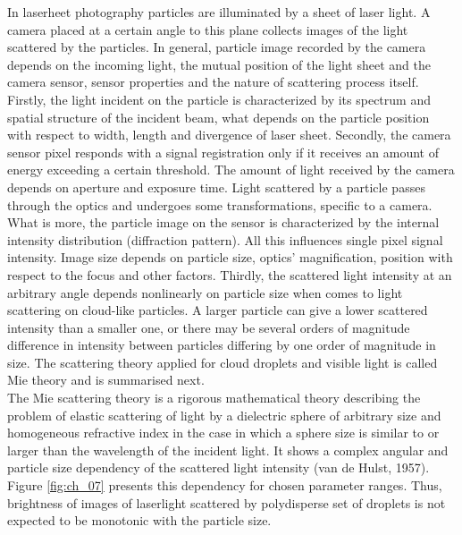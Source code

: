 \documentclass[../main.tex]{subfiles}
\begin{document}
In laserheet photography particles are illuminated by a sheet of laser light. A camera placed at a certain angle to this plane collects images of the light scattered by the particles. In general, particle image recorded by the camera depends on the incoming light, the mutual position of the light sheet and the camera sensor, sensor properties and the nature of scattering process itself. Firstly, the light incident on the particle is characterized by its spectrum and spatial structure of the incident beam, what depends on the particle position with respect to width, length and divergence of laser sheet. Secondly, the camera sensor pixel responds with a signal registration only if it receives an amount of energy exceeding a certain threshold. The amount of light received by the camera depends on aperture and exposure time. Light scattered by a particle passes through the optics and undergoes some transformations, specific to a camera. What is more, the particle image on the sensor is characterized by the internal intensity distribution (diffraction pattern). All this influences single pixel signal intensity. Image size depends on particle size, optics’ magnification, position with respect to the focus and other factors\citep{Olsen2000}. Thirdly, the scattered light intensity at an arbitrary angle depends nonlinearly on particle size when comes to light scattering on cloud-like particles. A larger particle can give a lower scattered intensity than a smaller one, or there may be several orders of magnitude difference in intensity between particles differing by one order of magnitude in size. The scattering theory applied for cloud droplets and visible light is called Mie theory and is summarised next.\\
The Mie scattering theory is a rigorous mathematical theory describing the problem of elastic scattering of light by a dielectric sphere of arbitrary size and homogeneous refractive index in the case in which a sphere size is similar to or larger than the wavelength of the incident light. It shows a complex angular and particle size dependency of the scattered light intensity (van de Hulst, 1957). Figure \ref{fig:ch_07} presents this dependency for chosen parameter ranges. Thus, brightness of images of laserlight scattered by polydisperse set of droplets is not expected to be monotonic with the particle size.
\end{document}
